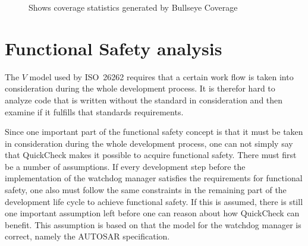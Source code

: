 \begin{figure}[!ht]
  \setlength\fboxsep{0pt}
  \setlength\fboxrule{0.5pt}
  \caption{Shows coverage statistics generated by Bullseye Coverage}
  \label{FIG:BULLSEYE}
\end{figure}


\section{Functional Safety analysis}
The $V$ model used by ISO~26262 requires that a certain work flow is
taken into consideration during the whole development process. It is
therefor hard to analyze code that is written without the standard in
consideration and then examine if it fulfills that standards
requirements.

Since one important part of the functional safety concept is that it
must be taken in consideration during the whole development process,
one can not simply say that QuickCheck makes it possible to acquire
functional safety. There must first be a number of assumptions. If
every development step before the implementation of the watchdog
manager satisfies the requirements for functional safety, one also
must follow the same constraints in the remaining part of the
development life cycle to achieve functional safety. If this is
assumed, there is still one important assumption left before one can
reason about how QuickCheck can benefit. This assumption is based on
that the model for the watchdog manager is correct, namely the AUTOSAR
specification.

